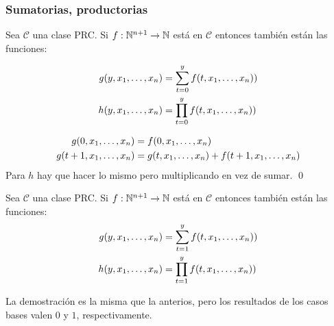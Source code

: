 \subsubsection{Sumatorias, productorias}\label{sec::primitivas::sumatoria}

\begin{teorema}\label{teorema::sumProdSonPRC}
Sea $\mathcal{C}$ una clase PRC. Si $f:\mathbb{N}^{n+1}\to\mathbb{N}$ está en $\mathcal{C}$ entonces también están las funciones:

\begin{align*}
	g(y,x_1,\dots, x_{n}) &= \sum_{t=0}^{y} f(t,x_1,\dots, x_{n})) \\
	h(y,x_1,\dots, x_{n}) &= \prod_{t=0}^{y} f(t,x_1,\dots, x_{n})) \\
\end{align*}

\end{teorema}

\begin{demo}
	\vspace*{-0.5cm}
\begin{align*}
	g(0,x_1,\dots, x_{n}) &= f(0, x_1,\dots, x_{n}) \\
	g(t+1,x_1,\dots, x_{n}) &= g(t, x_1,\dots, x_{n}) + f(t+1, x_1,\dots, x_{n})
\end{align*}
Para $h$ hay que hacer lo mismo pero multiplicando en vez de sumar. \qed
\end{demo}

\begin{teorema}
Sea $\mathcal{C}$ una clase PRC. Si $f:\mathbb{N}^{n+1}\to\mathbb{N}$ está en $\mathcal{C}$ entonces también están las funciones:
\begin{align*}
	g(y,x_1,\dots, x_{n}) &= \sum_{t=1}^{y} f(t,x_1,\dots, x_{n})) \\
	h(y,x_1,\dots, x_{n}) &= \prod_{t=1}^{y} f(t,x_1,\dots, x_{n})) \\
\end{align*}
\end{teorema}

La demostración es la misma que la anterios, pero los resultados de los casos bases valen $0$ y $1$, respectivamente.

